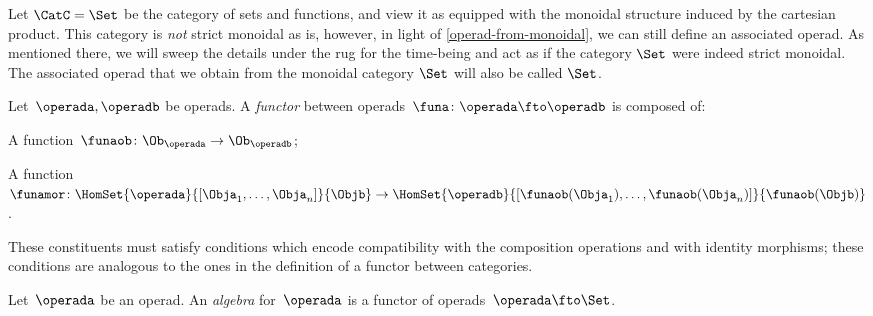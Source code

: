 \begin{example}
Let $\CatC = \Set$ be the category of sets and functions, and view it as equipped with the monoidal structure induced by the cartesian product. This category is \emph{not} strict monoidal as is, however, in light of \cref{operad-from-monoidal}, we can still define an associated operad. As mentioned there, we will sweep the details under the rug for the time-being and act as if the category $\Set$ were indeed strict monoidal. The associated operad that we obtain from the monoidal category $\Set$ will also be called $\Set$.
\end{example}

\begin{ctdefinition}
  \label{def:functors_operads}
  Let~$\operada,\operadb$ be operads. A \emph{functor} between operads~$\funa\colon \operada \fto \operadb$  is composed of:
  \begin{compactenum}
    \item A function~$\funaob\colon \Ob_\operada\to \Ob_\operadb$;
    \item A function~$\funamor\colon \HomSet{\operada}{[\Obja_1,\ldots,\Obja_n]}{\Objb}\to \HomSet{\operadb}{[\funaob(\Obja_1),\ldots, \funaob(\Obja_n)]}{\funaob(\Objb)}$.
  \end{compactenum}
  These constituents must satisfy conditions which encode compatibility with the composition operations and with identity morphisms; these conditions are analogous to the ones in the definition of a functor between categories.
\end{ctdefinition}


\begin{definition}
  \label{def:algebra_operad}
  Let~$\operada$ be an operad. An \emph{algebra} for~$\operada$ is a functor of operads~$\operada \fto \Set$.
\end{definition}

\begin{example}
\end{example}

\begin{example}

\end{example}


